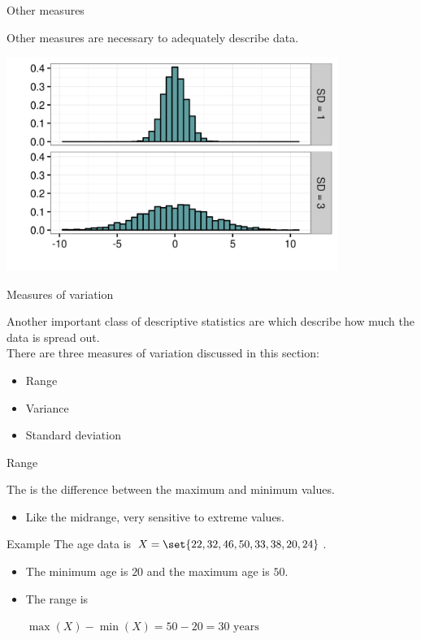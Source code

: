 \documentclass[xcolor=table, handout]{beamer}
\begin{document}
\begin{frame}{Other measures}
\begin{block}{}
\large
Other measures are necessary to adequately describe data.
\end{block}
\pause
\bigskip
{\centering
\includegraphics[width=4.25in]{../images/ch03_var_diff}
\par}
\end{frame}

\begin{frame}{Measures of variation}
\begin{block}{}
\large
Another important class of descriptive statistics are  which describe how much the data is spread out.\\
\medskip
There are three measures of variation discussed in this section:
\begin{itemize}
\item Range
\item Variance
\item Standard deviation
\end{itemize}

\end{block}
\end{frame}

\begin{frame}{Range}
\begin{block}{}
\large
The  is the difference between the maximum and minimum values.
\begin{itemize}
\item Like the midrange, very sensitive to extreme values.
\end{itemize}
\end{block}

\pause
\begin{exampleblock}{Example}
The age data is $X = \set{22, 32, 46, 50, 33, 38, 20, 24}$.
\begin{itemize}
\item The minimum age is $20$ and the maximum age is $50$.
\pause
\item The range is \\
\smallskip
{\centering
$\max(X) - \min(X) = 50 - 20 = 30 \text{ years}$
\par}
\end{itemize}
\smallskip
\end{exampleblock}

\end{frame}
\end{document}
